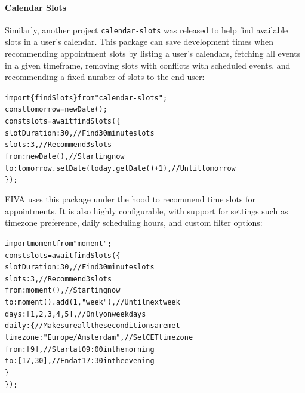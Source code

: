 \documentclass{article}
\begin{document}
\paragraph{Calendar Slots}

Similarly, another project \texttt{calendar-slots} was released to help find available slots in a user's calendar. This package can save development times when recommending appointment slots by listing a user's calendars, fetching all events in a given timeframe, removing slots with conflicts with scheduled events, and recommending a fixed number of slots to the end user:

\begin{alltt}
\textcolor{keyword}{import} \{ findSlots \} \textcolor{keyword}{from} \textcolor{string}{"calendar-slots"};
\textcolor{keyword}{const} tomorrow = \textcolor{keyword}{new} Date();
\textcolor{keyword}{const} slots = \textcolor{keyword}{await} \textcolor{variable}{findSlots}(\{
  \textcolor{symbol}{slotDuration}: \textcolor{literal}{30}, \textcolor{comment}{// Find 30 minute slots}
  \textcolor{symbol}{slots}: \textcolor{literal}{3}, \textcolor{comment}{// Recommend 3 slots}
  \textcolor{symbol}{from}: \textcolor{keyword}{new} Date(), \textcolor{comment}{// Starting now}
  \textcolor{symbol}{to}: tomorrow.\textcolor{variable}{setDate}(today.\textcolor{variable}{getDate}() + \textcolor{literal}{1}), \textcolor{comment}{// Until tomorrow}
\});
\end{alltt}

EIVA uses this package under the hood to recommend time slots for appointments. It is also highly configurable, with support for settings such as timezone preference, daily scheduling hours, and custom filter options:

\begin{alltt}
\textcolor{keyword}{import} moment from \textcolor{string}{"moment"};
\textcolor{keyword}{const} slots = \textcolor{keyword}{await} \textcolor{variable}{findSlots}(\{
  \textcolor{symbol}{slotDuration}: \textcolor{literal}{30}, \textcolor{comment}{// Find 30 minute slots}
  \textcolor{symbol}{slots}: \textcolor{literal}{3}, \textcolor{comment}{// Recommend 3 slots}
  \textcolor{symbol}{from}: moment(), \textcolor{comment}{// Starting now}
  \textcolor{symbol}{to}: moment().\textcolor{variable}{add}(\textcolor{literal}{1}, \textcolor{string}{"week"}), \textcolor{comment}{// Until next week}
  \textcolor{symbol}{days}: [\textcolor{literal}{1}, \textcolor{literal}{2}, \textcolor{literal}{3}, \textcolor{literal}{4}, \textcolor{literal}{5}], \textcolor{comment}{// Only on week days}
  \textcolor{symbol}{daily}: \{ \textcolor{comment}{// Make sure all these conditions are met}
    \textcolor{symbol}{timezone}: \textcolor{string}{"Europe/Amsterdam"}, \textcolor{comment}{// Set CET timezone}
    \textcolor{symbol}{from}: [\textcolor{literal}{9}], \textcolor{comment}{// Start at 09:00 in the morning}
    \textcolor{symbol}{to}: [\textcolor{literal}{17}, \textcolor{literal}{30}], \textcolor{comment}{// End at 17:30 in the evening}
  \}
\});
\end{alltt}
\end{document}
